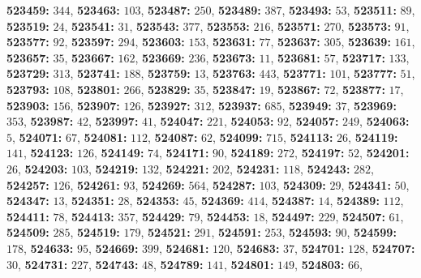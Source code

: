\textsf{\bfseries 523459:} $344$, \textsf{\bfseries 523463:} $103$, \textsf{\bfseries 523487:} $250$, \textsf{\bfseries 523489:} $387$, \textsf{\bfseries 523493:} $53$, \textsf{\bfseries 523511:} $89$, \textsf{\bfseries 523519:} $24$, \textsf{\bfseries 523541:} $31$, \textsf{\bfseries 523543:} $377$, \textsf{\bfseries 523553:} $216$, \textsf{\bfseries 523571:} $270$, \textsf{\bfseries 523573:} $91$, \textsf{\bfseries 523577:} $92$, \textsf{\bfseries 523597:} $294$, \textsf{\bfseries 523603:} $153$, \textsf{\bfseries 523631:} $77$, \textsf{\bfseries 523637:} $305$, \textsf{\bfseries 523639:} $161$, \textsf{\bfseries 523657:} $35$, \textsf{\bfseries 523667:} $162$, \textsf{\bfseries 523669:} $236$, \textsf{\bfseries 523673:} $11$, \textsf{\bfseries 523681:} $57$, \textsf{\bfseries 523717:} $133$, \textsf{\bfseries 523729:} $313$, \textsf{\bfseries 523741:} $188$, \textsf{\bfseries 523759:} $13$, \textsf{\bfseries 523763:} $443$, \textsf{\bfseries 523771:} $101$, \textsf{\bfseries 523777:} $51$, \textsf{\bfseries 523793:} $108$, \textsf{\bfseries 523801:} $266$, \textsf{\bfseries 523829:} $35$, \textsf{\bfseries 523847:} $19$, \textsf{\bfseries 523867:} $72$, \textsf{\bfseries 523877:} $17$, \textsf{\bfseries 523903:} $156$, \textsf{\bfseries 523907:} $126$, \textsf{\bfseries 523927:} $312$, \textsf{\bfseries 523937:} $685$, \textsf{\bfseries 523949:} $37$, \textsf{\bfseries 523969:} $353$, \textsf{\bfseries 523987:} $42$, \textsf{\bfseries 523997:} $41$, \textsf{\bfseries 524047:} $221$, \textsf{\bfseries 524053:} $92$, \textsf{\bfseries 524057:} $249$, \textsf{\bfseries 524063:} $5$, \textsf{\bfseries 524071:} $67$, \textsf{\bfseries 524081:} $112$, \textsf{\bfseries 524087:} $62$, \textsf{\bfseries 524099:} $715$, \textsf{\bfseries 524113:} $26$, \textsf{\bfseries 524119:} $141$, \textsf{\bfseries 524123:} $126$, \textsf{\bfseries 524149:} $74$, \textsf{\bfseries 524171:} $90$, \textsf{\bfseries 524189:} $272$, \textsf{\bfseries 524197:} $52$, \textsf{\bfseries 524201:} $26$, \textsf{\bfseries 524203:} $103$, \textsf{\bfseries 524219:} $132$, \textsf{\bfseries 524221:} $202$, \textsf{\bfseries 524231:} $118$, \textsf{\bfseries 524243:} $282$, \textsf{\bfseries 524257:} $126$, \textsf{\bfseries 524261:} $93$, \textsf{\bfseries 524269:} $564$, \textsf{\bfseries 524287:} $103$, \textsf{\bfseries 524309:} $29$, \textsf{\bfseries 524341:} $50$, \textsf{\bfseries 524347:} $13$, \textsf{\bfseries 524351:} $28$, \textsf{\bfseries 524353:} $45$, \textsf{\bfseries 524369:} $414$, \textsf{\bfseries 524387:} $14$, \textsf{\bfseries 524389:} $112$, \textsf{\bfseries 524411:} $78$, \textsf{\bfseries 524413:} $357$, \textsf{\bfseries 524429:} $79$, \textsf{\bfseries 524453:} $18$, \textsf{\bfseries 524497:} $229$, \textsf{\bfseries 524507:} $61$, \textsf{\bfseries 524509:} $285$, \textsf{\bfseries 524519:} $179$, \textsf{\bfseries 524521:} $291$, \textsf{\bfseries 524591:} $253$, \textsf{\bfseries 524593:} $90$, \textsf{\bfseries 524599:} $178$, \textsf{\bfseries 524633:} $95$, \textsf{\bfseries 524669:} $399$, \textsf{\bfseries 524681:} $120$, \textsf{\bfseries 524683:} $37$, \textsf{\bfseries 524701:} $128$, \textsf{\bfseries 524707:} $30$, \textsf{\bfseries 524731:} $227$, \textsf{\bfseries 524743:} $48$, \textsf{\bfseries 524789:} $141$, \textsf{\bfseries 524801:} $149$, \textsf{\bfseries 524803:} $66$, 
